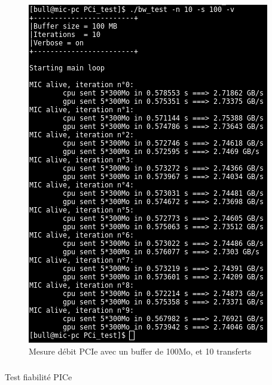 \documentclass{article}
\begin{document}
					\begin{figure}
					\begin{center}
					\includegraphics[scale=0.4]{bwtest.png}
					\caption{Mesure débit PCIe avec un buffer de 100Mo, et 10 transferts}
					\end{center}
					\end{figure}
					\subparagraph{}
					Test fiabilité PICe
\end{document}
